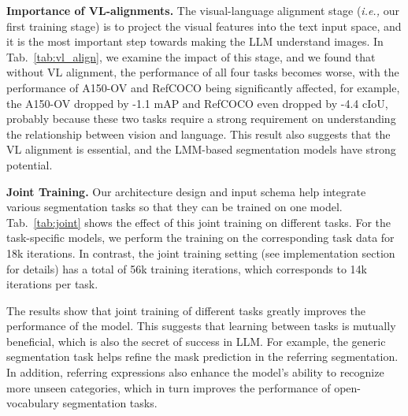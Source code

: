 \noindent\textbf{Importance of VL-alignments.}
The visual-language alignment stage (\textit{i.e.,} our first training stage) is to project the visual features into the text input space, and it is the most important step towards making the LLM understand images. In Tab.~\ref{tab:vl_align}, we examine the impact of this stage, and we found that without VL alignment, the performance of all four tasks becomes worse, with the performance of A150-OV and RefCOCO being significantly affected, for example, the A150-OV dropped by -1.1 mAP and RefCOCO even dropped by -4.4 cIoU, probably because these two tasks require a strong requirement on understanding the relationship between vision and language. This result also suggests that the VL alignment is essential, and the LMM-based segmentation models have strong potential.

\noindent\textbf{Joint Training.}
Our architecture design and input schema help integrate various segmentation tasks so that they can be trained on one model. Tab.~\ref{tab:joint} shows the effect of this joint training on different tasks. For the task-specific models, we perform the training on the corresponding task data for 18k iterations. In contrast, the joint training setting (see implementation section for details) has a total of 56k training iterations, which corresponds to 14k iterations per task.

The results show that joint training of different tasks greatly improves the performance of the model. This suggests that learning between tasks is mutually beneficial, which is also the secret of success in LLM. For example, the generic segmentation task helps refine the mask prediction in the referring segmentation. In addition, referring expressions also enhance the model’s ability to recognize more unseen categories, which in turn improves the performance of open-vocabulary segmentation tasks.


